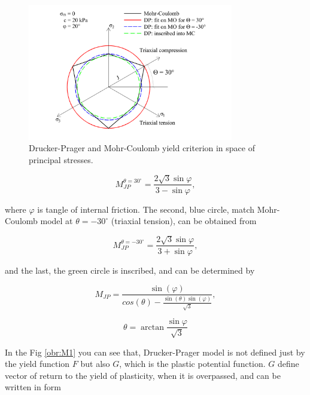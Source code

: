\begin{figure}[h!]
	\centering	
	\includegraphics[width=0.8\textwidth, angle=0]{obrazky/drucker-prager_eng.png}
	\caption[Drucker-Prager a Mohr-Coulomb model $T$]{Drucker-Prager and Mohr-Coulomb yield criterion in space of principal stresses. \label{obr:F1}}
\end{figure}



\begin{equation}\label{eq:f_Mjp_30}
	M_{JP}^{\theta=30^\circ} = \dfrac{2\sqrt{3}\sin\varphi}{3-\sin \varphi},
\end{equation}

where $\varphi$ is tangle of internal friction. The second, blue circle, match Mohr-Coulomb model at  $\theta = -30^\circ$ (triaxial tension), can be obtained from

\begin{equation}\label{eq:f_Mjp_-30}
	M_{JP}^{\theta=-30^\circ} = \dfrac{2\sqrt{3}\sin\varphi}{3+\sin \varphi},
\end{equation}

and the last, the green circle is inscribed, and can be determined by

\begin{equation}\label{eq:f_Mjp_i}
	M_{JP} = \dfrac{\sin(\varphi)}{cos(\theta)-\frac{\sin(\theta)\sin(\varphi)}{\sqrt{3}}},
\end{equation}

\begin{equation}\label{eq:f_theta}
	\theta = \arctan{\frac{\sin{\varphi}}{\sqrt{3}}}
\end{equation}

In the Fig \ref{obr:M1} you can see that, Drucker-Prager model is not defined just by the yield function $F$ but also $G$, which is the plastic potential function. $G$ define vector of return to the yield of plasticity, when it is overpassed, and can be written in form 

